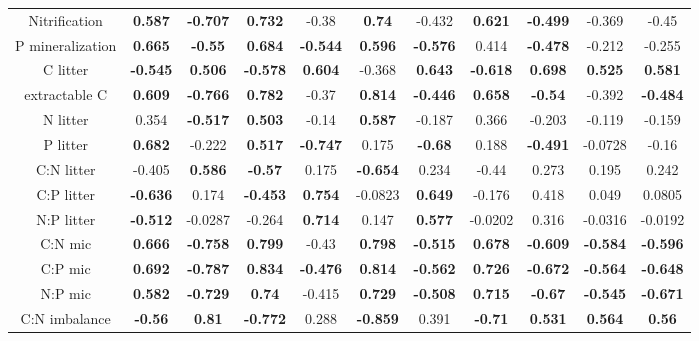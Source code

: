 \documentclass[authoryear,preprint,review,12pt]{elsarticle}
\begin{document}
\begin{table}[h!]
\begin{center}
{\begin{tabular}{ccccccccccc}
  Nitrification & \textbf{ 0.587 } & \textbf{ -0.707 } & \textbf{ 0.732 } & -0.38 & \textbf{ 0.74 } & -0.432 & \textbf{ 0.621 } & \textbf{ -0.499 } & -0.369 & -0.45 \\ 
  P mineralization & \textbf{ 0.665 } & \textbf{ -0.55 } & \textbf{ 0.684 } & \textbf{ -0.544 } & \textbf{ 0.596 } & \textbf{ -0.576 } & 0.414 & \textbf{ -0.478 } & -0.212 & -0.255 \\ 
  C litter & \textbf{ -0.545 } & \textbf{ 0.506 } & \textbf{ -0.578 } & \textbf{ 0.604 } & -0.368 & \textbf{ 0.643 } & \textbf{ -0.618 } & \textbf{ 0.698 } & \textbf{ 0.525 } & \textbf{ 0.581 } \\ 
  extractable C & \textbf{ 0.609 } & \textbf{ -0.766 } & \textbf{ 0.782 } & -0.37 & \textbf{ 0.814 } & \textbf{ -0.446 } & \textbf{ 0.658 } & \textbf{ -0.54 } & -0.392 & \textbf{ -0.484 } \\ 
  N litter & 0.354 & \textbf{ -0.517 } & \textbf{ 0.503 } & -0.14 & \textbf{ 0.587 } & -0.187 & 0.366 & -0.203 & -0.119 & -0.159 \\ 
  P litter & \textbf{ 0.682 } & -0.222 & \textbf{ 0.517 } & \textbf{ -0.747 } & 0.175 & \textbf{ -0.68 } & 0.188 & \textbf{ -0.491 } & -0.0728 & -0.16 \\ 
  C:N litter & -0.405 & \textbf{ 0.586 } & \textbf{ -0.57 } & 0.175 & \textbf{ -0.654 } & 0.234 & -0.44 & 0.273 & 0.195 & 0.242 \\ 
  C:P litter & \textbf{ -0.636 } & 0.174 & \textbf{ -0.453 } & \textbf{ 0.754 } & -0.0823 & \textbf{ 0.649 } & -0.176 & 0.418 & 0.049 & 0.0805 \\ 
  N:P litter & \textbf{ -0.512 } & -0.0287 & -0.264 & \textbf{ 0.714 } & 0.147 & \textbf{ 0.577 } & -0.0202 & 0.316 & -0.0316 & -0.0192 \\ 
  C:N mic & \textbf{ 0.666 } & \textbf{ -0.758 } & \textbf{ 0.799 } & -0.43 & \textbf{ 0.798 } & \textbf{ -0.515 } & \textbf{ 0.678 } & \textbf{ -0.609 } & \textbf{ -0.584 } & \textbf{ -0.596 } \\ 
  C:P mic & \textbf{ 0.692 } & \textbf{ -0.787 } & \textbf{ 0.834 } & \textbf{ -0.476 } & \textbf{ 0.814 } & \textbf{ -0.562 } & \textbf{ 0.726 } & \textbf{ -0.672 } & \textbf{ -0.564 } & \textbf{ -0.648 } \\ 
  N:P mic & \textbf{ 0.582 } & \textbf{ -0.729 } & \textbf{ 0.74 } & -0.415 & \textbf{ 0.729 } & \textbf{ -0.508 } & \textbf{ 0.715 } & \textbf{ -0.67 } & \textbf{ -0.545 } & \textbf{ -0.671 } \\ 
  C:N imbalance & \textbf{ -0.56 } & \textbf{ 0.81 } & \textbf{ -0.772 } & 0.288 & \textbf{ -0.859 } & 0.391 & \textbf{ -0.71 } & \textbf{ 0.531 } & \textbf{ 0.564 } & \textbf{ 0.56 } \\ 

\end{tabular}}
\end{center}
\end{table}
\end{document}
